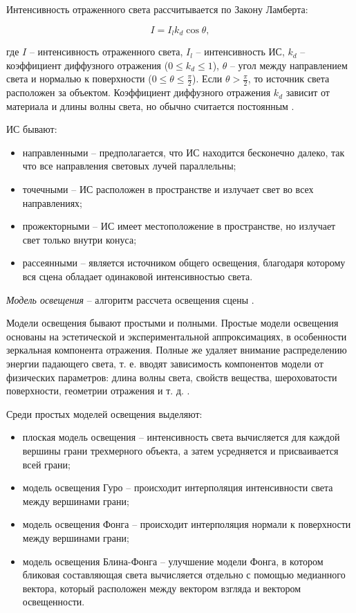 Интенсивность отраженного света рассчитывается по Закону Ламберта:

\begin{equation}
	I = I_l k_d \cos \theta,
\end{equation}

где $I$ -- интенсивность отраженного света, $I_l$ -- интенсивность ИС, $k_d$ -- коэффициент диффузного отражения ($0 \leq k_d \leq 1$), $\theta$ -- угол между направлением света и нормалью к поверхности ($0 \leq \theta \leq \frac{\pi}{2}$). Если $\theta > \frac{\pi}{2}$, то источник света расположен за объектом. Коэффициент диффузного отражения $k_d$ зависит от материала и длины волны света, но обычно считается постоянным \cite{rogers}.

ИС бывают:

\begin{itemize}
	\item направленными -- предполагается, что ИС находится бесконечно далеко, так что все направления световых лучей параллельны;
	\item точечными -- ИС расположен в пространстве и излучает свет во всех направлениях;
	\item прожекторными -- ИС имеет местоположение в пространстве, но излучает свет только внутри конуса;
	\item рассеянными -- является источником общего освещения, благодаря которому вся сцена обладает одинаковой интенсивностью света.
\end{itemize}

\textit{Модель освещения} -- алгоритм рассчета освещения сцены \cite{eberly20063d}. 

Модели освещения бывают простыми и полными. Простые модели освещения основаны на эстетической и экспериментальной аппроксимациях, в особенности зеркальная компонента отражения. Полные же удаляет внимание распределению энергии падающего света, т. е. вводят зависимость компонентов модели от физических параметров: длина волны света, свойств вещества, шероховатости поверхности, геометрии отражения и т. д. \cite{rogers}.

Среди простых моделей освещения выделяют:

\begin{itemize}
	\item плоская модель освещения -- интенсивность света вычисляется для каждой вершины грани трехмерного объекта, а затем усредняется и присваивается всей грани;
	\item модель освещения Гуро -- происходит интерполяция интенсивности света между вершинами грани;
	\item модель освещения Фонга -- происходит интерполяция нормали к поверхности между вершинами грани;
	\item модель освещения Блина-Фонга -- улучшение модели Фонга, в котором бликовая составляющая света вычисляется отдельно с помощью медианного вектора, который расположен между вектором взгляда и вектором освещенности.
\end{itemize}

